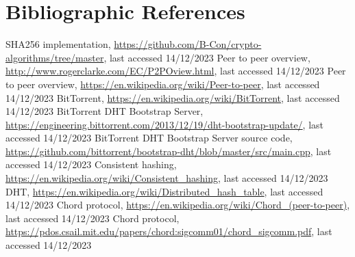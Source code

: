 \documentclass[runningheads]{llncs}
\begin{document}
\section{Bibliographic References} \label{references}
\begin{thebibliography}{99}
     SHA256 implementation, \url{https://github.com/B-Con/crypto-algorithms/tree/master}, last accessed 14/12/2023
     Peer to peer overview, \url{http://www.rogerclarke.com/EC/P2POview.html}, last accessed 14/12/2023
     Peer to peer overview, \url{https://en.wikipedia.org/wiki/Peer-to-peer}, last accessed 14/12/2023
     BitTorrent, \url{https://en.wikipedia.org/wiki/BitTorrent}, last accessed 14/12/2023
     BitTorrent DHT Bootstrap Server, \url{https://engineering.bittorrent.com/2013/12/19/dht-bootstrap-update/}, last accessed 14/12/2023
     BitTorrent DHT Bootstrap Server source code, \url{https://github.com/bittorrent/bootstrap-dht/blob/master/src/main.cpp}, last accessed 14/12/2023
     Consistent hashing, \url{https://en.wikipedia.org/wiki/Consistent\_hashing}, last accessed 14/12/2023
     DHT, \url{https://en.wikipedia.org/wiki/Distributed\_hash\_table}, last accessed 14/12/2023
     Chord protocol, \url{https://en.wikipedia.org/wiki/Chord\_(peer-to-peer)}, last accessed 14/12/2023
     Chord protocol, \url{https://pdos.csail.mit.edu/papers/chord:sigcomm01/chord\_sigcomm.pdf}, last accessed 14/12/2023
\end{thebibliography}
\end{document}
